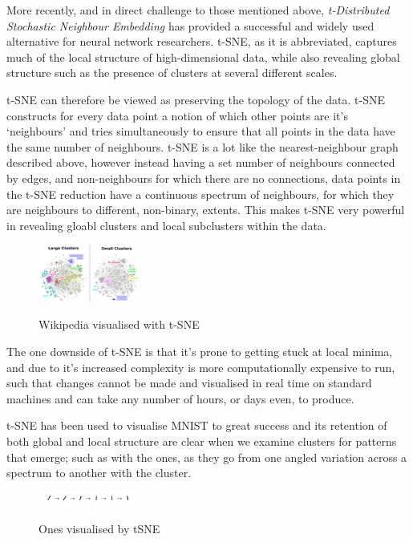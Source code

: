 \documentclass[a4paper,11pt,titlepage]{article}
\begin{document}
		More recently, and in direct challenge to those mentioned above, \textit{t-Distributed Stochastic Neighbour Embedding} \cite{Maaten2008} has provided a successful and widely used alternative for neural network researchers. t-SNE, as it is abbreviated, captures much of the local structure of high-dimensional data, while also revealing global structure such as the presence of clusters at several different scales.
		\par 
		t-SNE can therefore be viewed as preserving the topology of the data. t-SNE constructs for every data point a notion of which other points are it's `neighbours' and tries simultaneously to ensure that all points in the data have the same number of neighbours. t-SNE is a lot like the nearest-neighbour graph described above, however instead having a set number of neighbours connected by edges, and non-neighbours for which there are no connections, data points in the t-SNE reduction have a continuous spectrum of neighbours, for which they are neighbours to different, non-binary, extents. This makes t-SNE very powerful in revealing gloabl clusters and local subclusters within the data.
 		
	\begin{figure}[H]
    			\centering	
			{{\includegraphics[width=0.3\textwidth]
    				{img/colah_wiki_large.png} 
    			}}%
    			\caption{Wikipedia visualised with t-SNE}%
    		\label{fig:wiki}
	\end{figure}	  	

		\par
		 The one downside of t-SNE is that it's prone to getting stuck at local minima, and due to it's increased complexity is more computationally expensive to run, such that changes cannot be made and visualised in real time on standard machines and can take any number of hours, or days even, to produce.  
		\par 
		t-SNE has been used to visualise MNIST to great success \cite{Maaten2008} and its retention of both global and local structure are clear when we examine clusters for patterns that emerge; such as with the ones, as they go from one angled variation across a spectrum to another with the cluster.
 		
 	\begin{figure}[H]
    			\centering	
			{{\includegraphics[width=0.3\textwidth]
    				{img/colah_tsne_distribution.png} 
    			}}%
    			\caption{Ones visualised by tSNE}%
    		\label{fig:wiki}
	\end{figure}	  
 		
\end{document}
